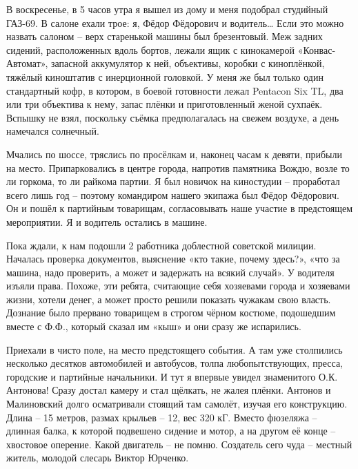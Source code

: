 
В воскресенье, в 5 часов утра я вышел из дому и меня подобрал студийный ГАЗ-69.
В салоне ехали трое: я, Фёдор Фёдорович и водитель… Если это можно назвать
салоном – верх старенькой машины был брезентовый. Меж задних сидений,
расположенных вдоль бортов, лежали ящик с кинокамерой «Конвас-Автомат»,
запасной аккумулятор к ней, объективы, коробки с киноплёнкой, тяжёлый
киноштатив с инерционной головкой. У меня же был только один стандартный кофр,
в котором, в боевой готовности лежал Pentacon Six TL, два или три объектива к
нему, запас плёнки и приготовленный женой сухпаёк. Вспышку не взял, поскольку
съёмка предполагалась на свежем воздухе, а день намечался солнечный.


Мчались по шоссе, тряслись по просёлкам и, наконец часам к девяти, прибыли на
место. Припарковались в центре города, напротив памятника Вождю, возле то ли
горкома, то ли райкома партии. Я был новичок на киностудии – проработал всего
лишь год – поэтому командиром нашего экипажа был Фёдор Фёдорович. Он и пошёл к
партийным товарищам, согласовывать наше участие в предстоящем мероприятии. Я и
водитель остались в машине.


Пока ждали, к нам подошли 2 работника доблестной советской милиции. Началась
проверка документов, выяснение «кто такие, почему здесь?», «что за машина, надо
проверить, а может и задержать на всякий случай». У водителя изъяли права.
Похоже, эти ребята, считающие себя хозяевами города и хозяевами жизни, хотели
денег, а может просто решили показать чужакам свою власть. Дознание было
прервано товарищем в строгом чёрном костюме, подошедшим вместе с Ф.Ф., который
сказал им «кыш» и они сразу же испарились.

Приехали в чисто поле, на место предстоящего события. А там уже столпились
несколько десятков автомобилей и автобусов, толпа любопытствующих, пресса,
городские и партийные начальники. И тут я впервые увидел знаменитого О.К.
Антонова! Сразу достал камеру и стал щёлкать, не жалея плёнки. Антонов и
Малиновский долго осматривали стоящий там самолёт, изучая его конструкцию.
Длина – 15 метров, размах крыльев – 12, вес 320 кГ. Вместо фюзеляжа – длинная
балка, к которой подвешено сидение и мотор, а на другом её конце – хвостовое
оперение. Какой двигатель – не помню. Создатель сего чуда – местный житель,
молодой слесарь Виктор Юрченко. 


